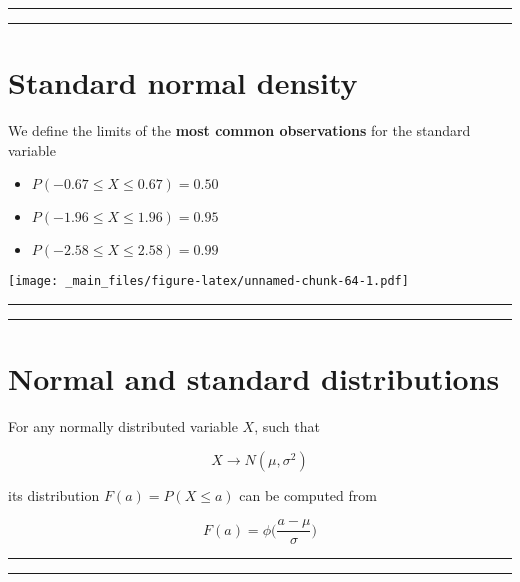 \documentclass[
]{book}
\providecommand{\tightlist}{%
  \setlength{\itemsep}{0pt}\setlength{\parskip}{0pt}}
\begin{document}
\begin{center}\rule{0.5\linewidth}{0.5pt}\end{center}

\begin{center}\rule{0.5\linewidth}{0.5pt}\end{center}

\hypertarget{standard-normal-density-4}{%
\section{Standard normal density}\label{standard-normal-density-4}}

We define the limits of the \textbf{most common observations} for the standard variable

\begin{itemize}
\tightlist
\item
  \(P(-0.67 \leq X \leq 0.67)=0.50\)
\item
  \(P(-1.96 \leq X \leq 1.96)=0.95\)
\item
  \(P(-2.58 \leq X \leq 2.58)=0.99\)
\end{itemize}

\texttt{[image: \_main\_files/figure-latex/unnamed-chunk-64-1.pdf]}

\begin{center}\rule{0.5\linewidth}{0.5pt}\end{center}

\begin{center}\rule{0.5\linewidth}{0.5pt}\end{center}

\hypertarget{normal-and-standard-distributions}{%
\section{Normal and standard distributions}\label{normal-and-standard-distributions}}

For any normally distributed variable \(X\), such that

\[X\rightarrow N(\mu, \sigma^2)\]

its distribution \(F(a)=P(X \leq a)\) can be computed from

\[F(a)= \phi \big(\frac{a-\mu}{\sigma}\big)\]

\begin{center}\rule{0.5\linewidth}{0.5pt}\end{center}

\begin{center}\rule{0.5\linewidth}{0.5pt}\end{center}
\end{document}
